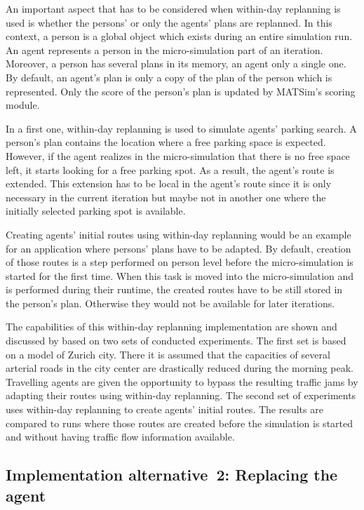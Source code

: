 An important aspect that has to be considered when within-day replanning is used is whether the persons' or only the agents' plans are replanned. In this context, a person is a global object which exists during an entire simulation run. An agent represents a person in the micro-simulation part of an iteration. Moreover, a person has several plans in its memory, an agent only a single one. By default, an agent's plan is only a copy of the plan of the person which is represented. Only the score of the person's plan is updated by MATSim's scoring module. 

In a first one, within-day replanning is used to simulate agents' parking search. A person's plan contains the location where a free parking space is expected. However, if the agent realizes in the micro-simulation that there is no free space left, it starts looking for a free parking spot. As a result, the agent's route is extended. This extension has to be local in the agent's route since it is only necessary in the current iteration
but maybe not in another one where the initially selected parking spot is available.

Creating agents' initial routes using within-day replanning would be an example for an application where persons' plans have to be adapted. By default, creation of those routes is a step performed on person level before the micro-simulation is started for the first time. When this task is moved into the micro-simulation and is performed during their runtime, the created routes have to be still stored in the person's plan. Otherwise they would not be available for later iterations.

The capabilities of this within-day replanning implementation are shown and discussed by \citet{Dobler_PhDThesis_2013} based on two sets of conducted experiments. The first set is based on a model of Zurich city. There it is assumed that the capacities of several arterial roads in the city center are drastically reduced during the morning peak. Travelling agents are given the opportunity to bypass the resulting traffic jams by adapting their routes using within-day replanning. The second set of experiments uses within-day replanning to create agents' initial routes. The results are compared to runs where those routes are created before the simulation is started and without having traffic flow information available.

\subsection{Implementation alternative~2: Replacing the agent}
\label{sec:impl-repl-the-ag}


